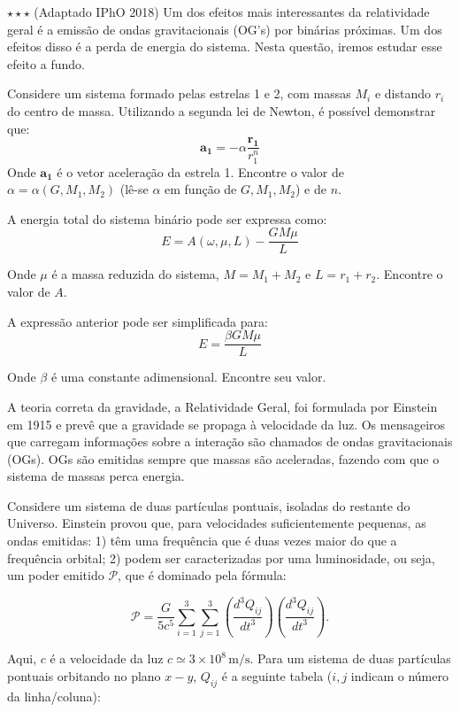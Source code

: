 \documentclass[11pt]{article}
\begin{document}
\begin{pproblem}\(\star\star\star\) (Adaptado IPhO 2018) Um dos efeitos mais interessantes da relatividade geral é a emissão de ondas gravitacionais (OG's) por binárias próximas. Um dos efeitos disso é a perda de energia do sistema. Nesta questão, iremos estudar esse efeito a fundo.

\begin{alternativas}
    \item Considere um sistema formado pelas estrelas 1 e 2, com massas \(M_i\) e distando \(r_i\) do centro de massa. Utilizando a segunda lei de Newton, é possível demonstrar que:
    \[\mathbf{a_1} = -\alpha \frac{\mathbf{r_1}}{r_1^n}\]
    Onde \(\mathbf{a_1}\) é o vetor aceleração da estrela 1. Encontre o valor de \(\alpha = \alpha (G, M_1, M_2)\) (lê-se \(\alpha\) em função de \(G, M_1, M_2\)) e de \(n\).

    \item A energia total do sistema binário pode ser expressa como:
    \[E = A(\omega, \mu, L) - \frac{GM\mu}{L}\]

    Onde \(\mu\) é a massa reduzida do sistema, \(M = M_1+M_2\) e \(L = r_1+r_2\). Encontre o valor de \(A\).

    \item A expressão anterior pode ser simplificada para:
    \[E = \frac{\beta GM\mu}{L}\]

    Onde \(\beta\) é uma constante adimensional. Encontre seu valor.

    A teoria correta da gravidade, a Relatividade Geral, foi formulada por Einstein em 1915 e prevê que a gravidade se propaga à velocidade da luz. Os mensageiros que carregam informações sobre a interação são chamados de ondas gravitacionais (OGs). OGs são emitidas sempre que massas são aceleradas, fazendo com que o sistema de massas perca energia.

    Considere um sistema de duas partículas pontuais, isoladas do restante do Universo. Einstein provou que, para velocidades suficientemente pequenas, as ondas emitidas: 1) têm uma frequência que é duas vezes maior do que a frequência orbital; 2) podem ser caracterizadas por uma luminosidade, ou seja, um poder emitido \(\mathcal{P}\), que é dominado pela fórmula:

    \[
    \mathcal{P} = \frac{G}{5c^5} \sum_{i=1}^3 \sum_{j=1}^3 \left( \frac{d^3 Q_{ij}}{dt^3} \right) \left( \frac{d^3 Q_{ij}}{dt^3} \right).
    \]

    Aqui, \( c \) é a velocidade da luz \( c \simeq 3 \times 10^8 \, \mathrm{m/s} \). Para um sistema de duas partículas pontuais orbitando no plano \( x-y \), \( Q_{ij} \) é a seguinte tabela (\( i, j \) indicam o número da linha/coluna):


\end{alternativas}
\end{pproblem}
\end{document}

